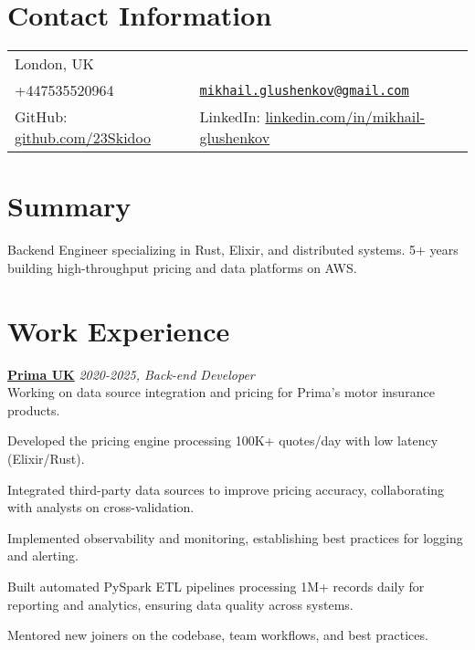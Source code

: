 \documentclass[margin,line]{res}
\begin{document}

\begin{resume}
      \section{\sc Contact Information}
      \vspace{.05in}
      \begin{tabular}{@{}p{3in}p{4in}}
            London, UK                                                                                          \\
            +447535520964                                                   &
            \href{mailto:mikhail.glushenkov@gmail.com}{\texttt{mikhail.glushenkov@gmail.com}}                   \\
            GitHub: \href{https://github.com/23Skidoo}{github.com/23Skidoo} &
            LinkedIn: \href{https://www.linkedin.com/in/mikhail-glushenkov}{linkedin.com/in/mikhail-glushenkov} \\
      \end{tabular}

      \section{\sc Summary} Backend Engineer specializing in Rust, Elixir, and
      distributed systems. 5+ years building high-throughput pricing and data
      platforms on AWS.

      \section{\sc Work Experience}

       {\bf \href{https://helloprima.co.uk}{Prima UK}} \hfill {\it 2020-2025, Back-end Developer}\\
      Working on data source integration and pricing for Prima's motor insurance
      products.\\
      \begin{list}{}{\leftmargin=1.5em}
            \item Developed the pricing engine processing 100K+ quotes/day with low latency (Elixir/Rust).
            \item Integrated third-party data sources to improve pricing accuracy, collaborating with analysts on cross-validation.
            \item Implemented observability and monitoring, establishing best practices for logging and alerting.
            \item Built automated PySpark ETL pipelines processing 1M+ records daily for
                  reporting and analytics, ensuring data quality across systems.
            \item Mentored new joiners on the codebase, team workflows, and best practices.
      \end{list}


\end{resume}
\end{document}
